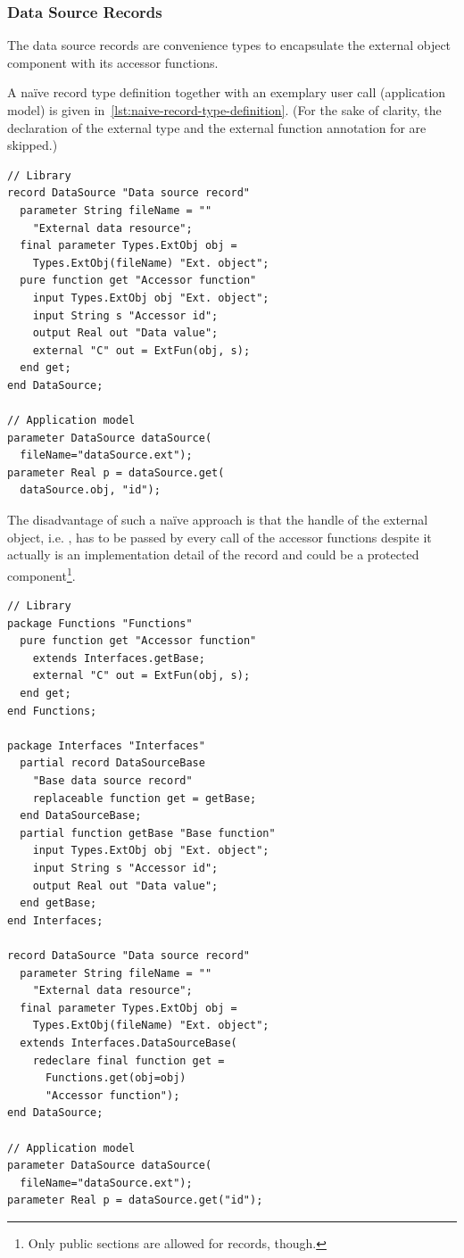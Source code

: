 \documentclass{modelica}
\newcommand{\modelica}[1]{\code{#1}}
\begin{document}
\subsubsection{Data Source Records}

The data source records are convenience types to encapsulate the external object component with its accessor functions.

A na\"ive record type definition together with an exemplary user call (application model) is given in~\autoref{lst:naive-record-type-definition}.
(For the sake of clarity, the declaration of the external type \modelica{Types.ExtObj} and the external function annotation for \modelica{ExtFun} are skipped.)

\begin{lstlisting}[caption=Na\"ive record type definition, label=lst:naive-record-type-definition, language=modelica]
// Library
record DataSource "Data source record"
  parameter String fileName = ""
    "External data resource";
  final parameter Types.ExtObj obj =
    Types.ExtObj(fileName) "Ext. object";
  pure function get "Accessor function"
    input Types.ExtObj obj "Ext. object";
    input String s "Accessor id";
    output Real out "Data value";
    external "C" out = ExtFun(obj, s);
  end get;
end DataSource;

// Application model
parameter DataSource dataSource(
  fileName="dataSource.ext");
parameter Real p = dataSource.get(
  dataSource.obj, "id");
\end{lstlisting}

The disadvantage of such a na\"ive approach is that the handle of the external object, i.e. \modelica{dataSource.obj}, has to be passed by every call of the accessor functions despite it actually is an implementation detail of the record and could be a protected component\footnote{Only public sections are allowed for records, though.}.

\begin{lstlisting}[caption=Sophisticated record type definition, label=lst:soph-record-type-definition, language=modelica]
// Library
package Functions "Functions"
  pure function get "Accessor function"
    extends Interfaces.getBase;
    external "C" out = ExtFun(obj, s);
  end get;
end Functions;

package Interfaces "Interfaces"
  partial record DataSourceBase
    "Base data source record"
    replaceable function get = getBase;
  end DataSourceBase;
  partial function getBase "Base function"
    input Types.ExtObj obj "Ext. object";
    input String s "Accessor id";
    output Real out "Data value";
  end getBase;
end Interfaces;

record DataSource "Data source record"
  parameter String fileName = ""
    "External data resource";
  final parameter Types.ExtObj obj =
    Types.ExtObj(fileName) "Ext. object";
  extends Interfaces.DataSourceBase(
    redeclare final function get =
      Functions.get(obj=obj)
      "Accessor function");
end DataSource;

// Application model
parameter DataSource dataSource(
  fileName="dataSource.ext");
parameter Real p = dataSource.get("id");
\end{lstlisting}
\end{document}
